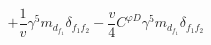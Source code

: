 %
\begin{dmath*}
%
  +  \frac{1}{v} \gamma^5 m_{d_{f_1}} \delta_{f_1 f_2}  -  \frac{v}{4} C^{ \varphi  D} \gamma^5 m_{d_{f_1}} \delta_{f_1 f_2}
%
\end{dmath*}
%
